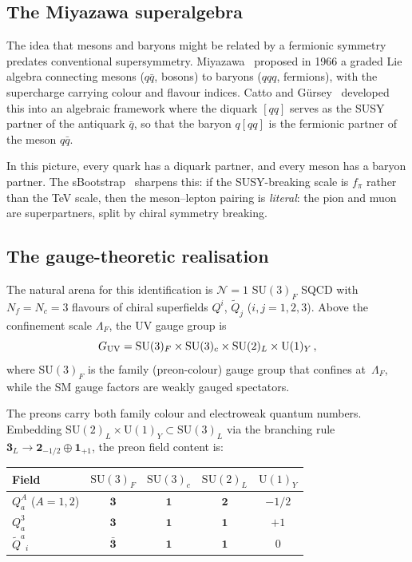 \documentclass[12pt,a4paper]{article}
\newcommand{\SU}{\mathrm{SU}}
\newcommand{\UU}{\mathrm{U}}
\newcommand{\Nf}{N_{\!f}}
\newcommand{\Nc}{N_{\!c}}
\begin{document}
\subsection{The Miyazawa superalgebra}

The idea that mesons and baryons might be related by a
fermionic symmetry predates conventional supersymmetry.
Miyazawa~\cite{Miyazawa:1966} proposed in 1966 a graded Lie
algebra connecting mesons ($q\bar{q}$, bosons) to baryons
($qqq$, fermions), with the supercharge carrying colour
and flavour indices.
Catto and G\"ursey~\cite{CattoGursey:1985} developed this into
an algebraic framework where the diquark $[qq]$ serves as the
SUSY partner of the antiquark $\bar{q}$, so that the baryon
$q[qq]$ is the fermionic partner of the meson $q\bar{q}$.

In this picture, every quark has a diquark partner, and every
meson has a baryon partner.
The sBootstrap~\cite{Rivero:2024epjc} sharpens this: if the
SUSY-breaking scale is $f_\pi$ rather than the TeV scale, then
the meson--lepton pairing is \emph{literal}: the pion and muon
are superpartners, split by chiral symmetry breaking.

\subsection{The gauge-theoretic realisation}

The natural arena for this identification is $\mathcal{N}{=}1$
$\SU(3)_F$ SQCD with $\Nf = \Nc = 3$ flavours of chiral
superfields $Q^i$, $\tilde{Q}_j$ ($i,j = 1,2,3$).
Above the confinement scale $\Lambda_F$, the UV gauge group is
\begin{equation}
  G_{\rm UV} = \SU(3)_F \times \SU(3)_c \times \SU(2)_L
    \times \UU(1)_Y\,,
  \label{eq:GUV}
\end{equation}
where $\SU(3)_F$ is the family (preon-colour) gauge group that
confines at~$\Lambda_F$, while the SM gauge factors are weakly
gauged spectators.

The preons carry both family colour and electroweak quantum
numbers.
Embedding $\SU(2)_L \times \UU(1)_Y \subset \SU(3)_L$ via
the branching rule
$\mathbf{3}_L \to \mathbf{2}_{-1/2} \oplus \mathbf{1}_{+1}$,
the preon field content is:
\begin{center}
\begin{tabular}{lcccc}
\toprule
Field & $\SU(3)_F$ & $\SU(3)_c$ & $\SU(2)_L$ & $\UU(1)_Y$ \\
\midrule
$Q^{A}_a$ ($A=1,2$) & $\mathbf{3}$ & $\mathbf{1}$ & $\mathbf{2}$ & $-1/2$ \\
$Q^{3}_a$ & $\mathbf{3}$ & $\mathbf{1}$ & $\mathbf{1}$ & $+1$ \\
$\tilde{Q}^a{}_i$ & $\bar{\mathbf{3}}$ & $\mathbf{1}$ & $\mathbf{1}$ & $0$ \\
\bottomrule
\end{tabular}
\end{center}
\end{document}
